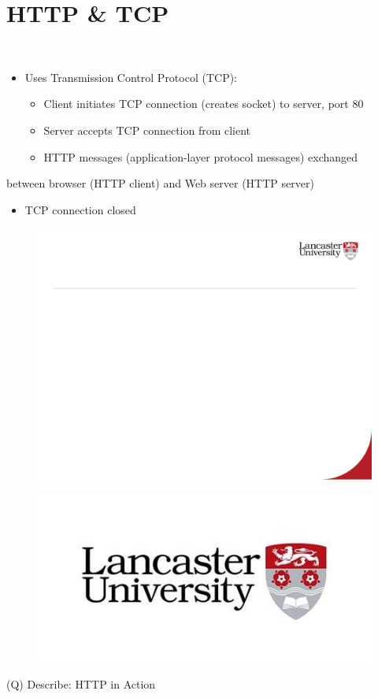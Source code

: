\documentclass[12pt]{article}
\begin{document}
\section{HTTP \& TCP}
\\
\begin{itemize}
  \item Uses Transmission Control Protocol (TCP):
\begin{itemize}
  \item Client initiates TCP connection (creates socket) to server, port 80
  \item Server accepts TCP connection from client
  \item HTTP messages (application-layer protocol messages) exchanged 
\end{itemize}
\end{itemize}
between browser (HTTP client) and Web server (HTTP server)\\
\begin{itemize}
  \item TCP connection closed
\end{itemize}
\begin{figure}[H]
\includegraphics[width=0.5\linewidth]{page23-image-1.png}
\end{figure}
\begin{figure}[H]
\includegraphics[width=0.5\linewidth]{page23-image-2.png}
\end{figure}
\clearpage
(Q)
Describe: HTTP in Action
\clearpage
\end{document}
